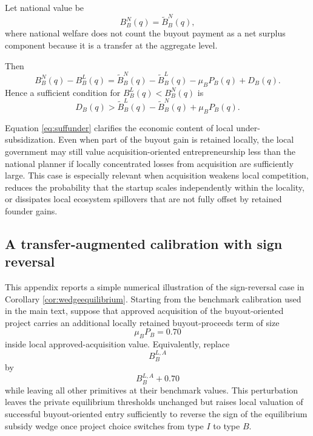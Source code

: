 Let national value be
\begin{equation}\label{eq:BNunder}
    B_B^N(q)=\widetilde B_B^N(q),
\end{equation}
where national welfare does not count the buyout payment as a net surplus component because it is a transfer at the aggregate level.

Then
\begin{equation}\label{eq:underdiff}
    B_B^N(q)-B_B^L(q)
    =
    \widetilde B_B^N(q)-\widetilde B_B^L(q)
    - \mu_B P_B(q)
    + D_B(q).
\end{equation}
Hence a sufficient condition for
\(
B_B^L(q) < B_B^N(q)
\)
is
\begin{equation}\label{eq:suffunder}
    D_B(q)
    >
    \widetilde B_B^L(q)
    - \widetilde B_B^N(q)
    + \mu_B P_B(q).
\end{equation}

Equation \eqref{eq:suffunder} clarifies the economic content of local under-subsidization.
Even when part of the buyout gain is retained locally, the local government may still value acquisition-oriented entrepreneurship less than the national planner if locally concentrated losses from acquisition are sufficiently large.
This case is especially relevant when acquisition weakens local competition, reduces the probability that the startup scales independently within the locality, or dissipates local ecosystem spillovers that are not fully offset by retained founder gains.

\subsection{A transfer-augmented calibration with sign reversal}\label{app:signreversalcalibration}

This appendix reports a simple numerical illustration of the sign-reversal case in Corollary \ref{cor:wedgeequilibrium}.
Starting from the benchmark calibration used in the main text, suppose that approved acquisition of the buyout-oriented project carries an additional locally retained buyout-proceeds term of size
\begin{equation}
    \mu_B P_B = 0.70
\end{equation}
inside local approved-acquisition value.
Equivalently, replace
\begin{equation}
    B_B^{L,A}
\end{equation}
by
\begin{equation}
    B_B^{L,A} + 0.70
\end{equation}
while leaving all other primitives at their benchmark values.
This perturbation leaves the private equilibrium thresholds unchanged but raises local valuation of successful buyout-oriented entry sufficiently to reverse the sign of the equilibrium subsidy wedge once project choice switches from type $I$ to type $B$.

